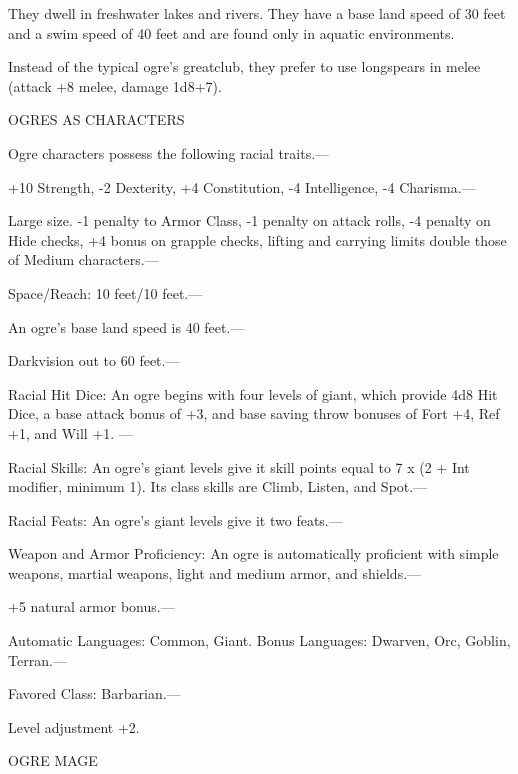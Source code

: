 \documentclass{article}
\begin{document}
They dwell in freshwater lakes and rivers. They have a base land speed of 30 feet 
and a swim speed of 40 feet and are found only in aquatic environments.

Instead of the typical ogre's greatclub, they prefer to use longspears in melee 
(attack +8 melee, damage 1d8+7).

OGRES AS CHARACTERS

Ogre characters possess the following racial traits.--- 

\parindent=3pt
+10 Strength, -2 Dexterity, +4 Constitution, -4 Intelligence, -4 Charisma.---

\parindent=0pt
Large size. -1 penalty to Armor Class, -1 penalty on attack rolls, -4 penalty on 
Hide checks, +4 bonus on grapple checks, lifting and carrying limits double those 
of Medium characters.---

Space/Reach: 10 feet/10 feet.---

An ogre's base land speed is 40 feet.---

Darkvision out to 60 feet.---

Racial Hit Dice: An ogre begins with four levels of giant, which provide 4d8 Hit 
Dice, a base attack bonus of +3, and base saving throw bonuses of Fort +4, Ref 
+1, and Will +1. ---

Racial Skills: An ogre's giant levels give it skill points equal to 7 x (2 + Int 
modifier, minimum 1). Its class skills are Climb, Listen, and Spot.---

Racial Feats: An ogre's giant levels give it two feats.---

Weapon and Armor Proficiency: An ogre is automatically proficient with simple weapons, 
martial weapons, light and medium armor, and shields.--- 

\parindent=3pt
+5 natural armor bonus.---

\parindent=0pt
Automatic Languages: Common, Giant. Bonus Languages: Dwarven, Orc, Goblin, Terran.---

Favored Class: Barbarian.---

Level adjustment +2.

\vspace{12pt}
{\LARGE{}OGRE MAGE}
\end{document}
